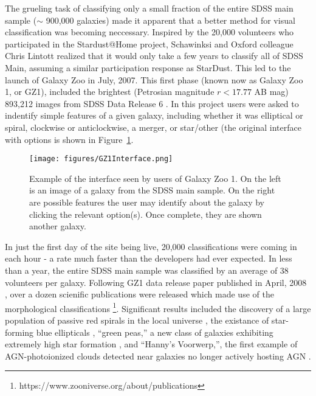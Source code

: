 The grueling task of classifying only a small fraction of the entire SDSS main sample ($\sim$ 900,000 galaxies) made it apparent that a better method for visual classification was becoming neccessary. Inspired by the 20,000 volunteers who participated in the Stardust@Home project, Schawinksi and Oxford colleague Chris Lintott realized that it would only take a few years to classify all of SDSS Main, assuming a similar participation response as StarDust. This led to the launch of Galaxy Zoo in July, 2007. This first phase (known now as Galaxy Zoo 1, or GZ1), included the brightest (Petrosian magnitude $r < 17.77$ AB mag) 893,212 images from SDSS Data Release 6 \citep{Strauss2002,AdelmanMcCarthy2008}. In this project users were asked to indentify simple features of a given galaxy, including whether it was elliptical or spiral, clockwise or anticlockwise, a merger, or star/other (the original interface with options is shown in Figure~\ref{GZ1_Interface}. 

\begin{figure}
\centering
\texttt{[image: figures/GZ1Interface.png]}
\caption{Example of the interface seen by users of Galaxy Zoo 1. On the left is an image of a galaxy from the SDSS main sample. On the right are possible features the user may identify about the galaxy by clicking the relevant option(s). Once complete, they are shown another galaxy.}
\label{GZ1_Interface}
\end{figure}

In just the first day of the site being live, 20,000 classifications were coming in each hour - a rate much faster than the developers had ever expected. In less than a year, the entire SDSS main sample was classified by an average of 38 volunteers per galaxy. Following GZ1 data release paper published in April, 2008 \citep{Lintott2008}, over a dozen scienific publications were released which made use of the morphological classifications \footnote{https://www.zooniverse.org/about/publications}. Significant results included the discovery of a large population of passive red spirals in the local universe \citep{Masters2010}, the existance of star-forming blue ellipticals \citep{Schawinski2009b}, ``green peas,'' a new class of galaxies exhibiting extremely high star formation \citep{Cardamone2009}, and ``Hanny's Voorwerp,'', the first example of AGN-photoionized clouds detected near galaxies no longer actively hosting AGN \citep{Lintott2009}.

